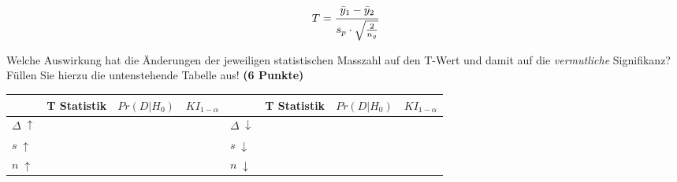 \documentclass[a4paper, 10pt]{scrartcl}\usepackage[]{graphicx}\usepackage[]{xcolor}
\begin{document}
\begin{equation*}
  \label{eq:1}
  T = \cfrac{\bar{y}_1 - \bar{y}_2}{s_p \cdot \sqrt{\tfrac{2}{n_g}}}
\end{equation*}

Welche Auswirkung hat die {\"A}nderungen der jeweiligen statistischen Masszahl
auf den T-Wert und damit auf die \textit{vermutliche} Signifikanz? F{\"u}llen
Sie hierzu die untenstehende Tabelle aus! \textbf{(6 Punkte)}

\begin{center}
  \large
  \begin{tabular}[c]{l|l|l|l|l|l|l|l}
    & T Statistik & $Pr(D|H_0)$ & $KI_{1-\alpha}$ & & T Statistik & $Pr(D|H_0)$ & $KI_{1-\alpha}$\strut\\ 
    \hline
    \textbf{$\Delta\; \uparrow$} & \hspace{2cm} & \hspace{2cm}  & \hspace{2cm} & \textbf{
                                                          $\Delta\; \downarrow$} &
                                                                          \hspace{2cm} & \hspace{2cm}  & \hspace{2cm}\strut\\
    \hline
        \textbf{$s\; \uparrow$} & \hspace{2cm} & \hspace{2cm}  & \hspace{2cm} & \textbf{
                                                          $s\; \downarrow$} &
                                                                          \hspace{2cm}
                                                & \hspace{2cm}  & \hspace{2cm}\strut\\
    \hline
        \textbf{$n\; \uparrow$} & \hspace{2cm} & \hspace{2cm}  & \hspace{2cm} & \textbf{
                                                          $n\; \downarrow$} &
                                                                          \hspace{2cm}
                                                & \hspace{2cm}  & \hspace{2cm}\strut\\
    \hline
  \end{tabular}
\end{center}
 
\end{document}

